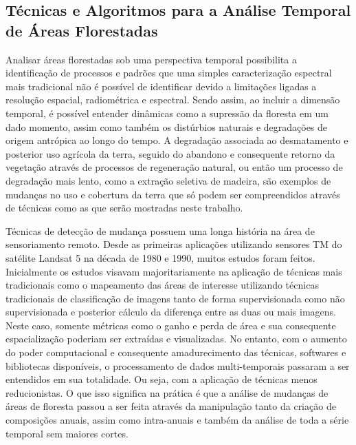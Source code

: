 \documentclass[12pt,a4paper]{article}
\begin{document}
\subsection{Técnicas e Algoritmos para a Análise Temporal de Áreas Florestadas}
\hspace{13pt} Analisar áreas florestadas sob uma perspectiva temporal possibilita a identificação de processos e padrões que uma simples caracterização espectral mais tradicional não é possível de identificar devido a limitações ligadas a resolução espacial, radiométrica e espectral. Sendo assim, ao incluir a dimensão temporal, é possível entender dinâmicas como a supressão da floresta em um dado momento, assim como também os distúrbios naturais e degradações de origem antrópica ao longo do tempo.
A degradação associada ao desmatamento e posterior uso agrícola da terra, seguido do abandono e consequente retorno da vegetação através de processos de regeneração natural, ou então um processo de degradação mais lento, como a extração seletiva de madeira, são exemplos de mudanças no uso e cobertura da terra que só podem ser compreendidos através de técnicas como as que serão mostradas neste trabalho. 

Técnicas de detecção de mudança possuem uma longa história na área de sensoriamento remoto. Desde as primeiras aplicações utilizando sensores TM do satélite Landsat 5 na década de 1980 e 1990, muitos estudos foram feitos. Inicialmente os estudos visavam majoritariamente na aplicação de técnicas mais tradicionais como o mapeamento das áreas de interesse utilizando técnicas tradicionais de classificação de imagens tanto de forma supervisionada como não supervisionada e posterior cálculo da diferença entre as duas ou mais imagens. Neste caso, somente métricas como o ganho e perda de área e sua consequente espacialização poderiam ser extraídas e visualizadas. No entanto, com o aumento do poder computacional e consequente amadurecimento das técnicas, softwares e bibliotecas disponíveis, o processamento de dados multi-temporais passaram a ser entendidos em sua totalidade. Ou seja, com a aplicação de técnicas menos reducionistas. O que isso significa na prática é que a análise de mudanças de áreas de floresta passou a ser feita através da manipulação tanto da criação de composições anuais, assim como intra-anuais e também da análise de toda a série temporal sem maiores cortes.
\end{document}
